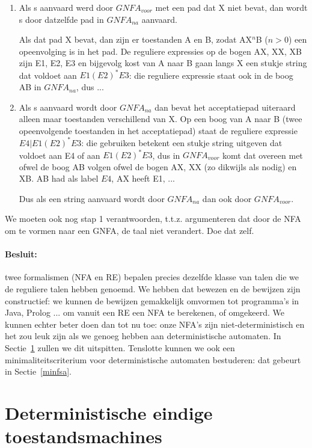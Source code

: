 \begin{enumerate}
\item
Als s aanvaard werd door $GNFA_{voor}$ met een pad dat X niet bevat,
dan wordt s door datzelfde pad in $GNFA_{na}$ aanvaard.

Als dat pad X bevat, dan zijn er toestanden A en B, zodat AX$^n$B
($n>0$) een opeenvolging is in het pad. De reguliere expressies op de
bogen AX, XX, XB zijn E1, E2, E3 en bijgevolg kost van A naar B gaan
langs X een stukje string dat voldoet aan $E1(E2)^*E3$: die reguliere
expressie staat ook in de boog AB in $GNFA_{na}$, dus ...

\item
Als s aanvaard wordt door $GNFA_{na}$ dan bevat het acceptatiepad
uiteraard alleen maar toestanden verschillend van X. Op een boog van A
naar B (twee opeenvolgende toestanden in het acceptatiepad) staat de
reguliere expressie $E4 | E1(E2)^*E3$: die gebruiken betekent een
stukje string uitgeven dat voldoet aan E4 of aan $E1(E2)^*E3$, dus in
$GNFA_{voor}$ komt dat overeen met ofwel de boog AB volgen ofwel de
bogen AX, XX (zo dikwijls als nodig) en XB. AB had als label
$E4$, AX heeft E1, ... 

Dus als een string aanvaard wordt door $GNFA_{na}$ dan ook door
$GNFA_{voor}$.

\end{enumerate}

We moeten ook nog stap 1 verantwoorden, t.t.z. argumenteren dat door
de NFA om te vormen naar een GNFA, de taal niet verandert. Doe dat zelf.


\paragraph{Besluit:} twee formalismen (NFA en RE) bepalen precies
dezelfde klasse van talen die we de reguliere talen hebben genoemd. We
hebben dat bewezen en de bewijzen zijn constructief: we kunnen de
bewijzen gemakkelijk omvormen tot programma's in Java, Prolog ... om
vanuit een RE een NFA te berekenen, of omgekeerd. We kunnen echter
beter doen dan tot nu toe: onze NFA's zijn niet-deterministisch en het
zou leuk zijn als we genoeg hebben aan deterministische automaten. In
Sectie~\ref{detfsa} zullen we dit uitspitten. Tenslotte kunnen we
ook een minimaliteitscriterium voor deterministische automaten
bestuderen: dat gebeurt in Sectie~\ref{minfsa}.






\section{Deterministische eindige toestandsmachines}\label{detfsa}

